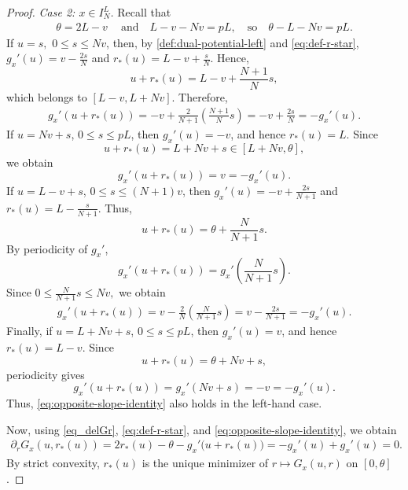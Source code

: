 \documentclass{article}
\begin{document}
\begin{proof}
\medskip
\noindent
\emph{Case 2: \(x\in I_N^L\).}
Recall that
\begin{align*}
    \theta=2L-v\ \quad \text{and} \quad L-v-Nv=pL, \quad \text{so}\quad \theta-L-Nv=pL.
\end{align*}
If \(u=s,\) \(0\leq s\leq Nv\), then, by \eqref{def:dual-potential-left} and  \eqref{eq:def-r-star}, \(g_x'(u) = v-\frac{2s}{N} \) and \(r_*(u) = L-v+\frac{s}{N} \).
Hence,
\[
    u+r_*(u)
    =
    L-v+\frac{N+1}{N}s,
\]
which belongs to \([L-v,L+Nv]\).
Therefore,
\begin{align*}
    g_x'(u+r_*(u))
    =
    -v
    +
    \frac{2}{N+1}
    \left(
        \frac{N+1}{N}s
    \right)
    =
    -v+\frac{2s}{N}
    =
    -g_x'(u).
\end{align*}
If \(u=Nv+s\), \(0\leq s\leq pL\), then \(g_x'(u)=-v\), and hence \(r_*(u)=L\).
Since
\[
    u+r_*(u)
    =
    L+Nv+s
    \in[L+Nv,\theta],
\]
we obtain
\[
    g_x'(u+r_*(u))
    =
    v
    =
    -g_x'(u).
\]
If \(u=L-v+s\), \(0\leq s\leq(N+1)v\), then \(g_x'(u) = -v+\frac{2s}{N+1} \) and \(r_*(u) = L-\frac{s}{N+1} \).
Thus,
\[
    u+r_*(u)
    =
    \theta+\frac{N}{N+1}s.
\]
By periodicity of \(g_x'\),
\[
    g_x'(u+r_*(u))
    =
    g_x'\left(
        \frac{N}{N+1}s
    \right).
\]
Since \(0 \leq \frac{N}{N+1}s \leq Nv, \) we obtain
\begin{align*}
    g_x'(u+r_*(u))
    =
    v
    -
    \frac{2}{N}
    \left(
        \frac{N}{N+1}s
    \right)
    =
    v-\frac{2s}{N+1}
    =
    -g_x'(u).
\end{align*}
Finally, if \(u=L+Nv+s\), \(0\leq s\leq pL\), then \(g_x'(u)=v\), and hence
\(
    r_*(u)=L-v
\).
Since
\[
    u+r_*(u)
    =
    \theta+Nv+s,
\]
periodicity gives
\[
    g_x'(u+r_*(u))
    =
    g_x'(Nv+s)
    =
    -v
    =
    -g_x'(u).
\]
Thus, \eqref{eq:opposite-slope-identity} also holds in the left-hand
case.

Now, using \eqref{eq_delGr}, \eqref{eq:def-r-star}, and \eqref{eq:opposite-slope-identity}, we obtain
\begin{align*}
    \partial_rG_x(u,r_*(u))
    =
    2r_*(u)-\theta
    -
    g_x'\bigl(u+r_*(u)\bigr)
    =
    -g_x'(u)+g_x'(u)
    =0.
\end{align*}
By strict convexity, \(r_*(u)\) is the unique minimizer of
\(r\mapsto G_x(u,r)\) on \([0,\theta]\).


\end{proof}
\end{document}
